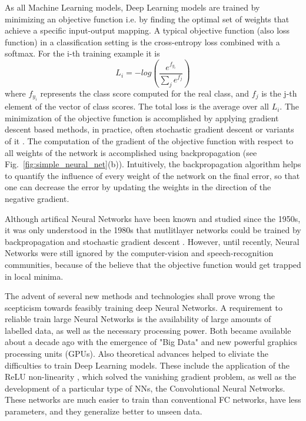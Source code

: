 As all Machine Learning models, Deep Learning models are trained by minimizing an objective function i.e. by finding the optimal set of weights that achieve a specific input-output mapping. A typical objective function (also loss function) in a classification setting is the cross-entropy loss combined with a softmax. For the i-th training example it is
$$
L_i = -log\left(\frac{e^{f_{y_i}}}{\sum_j e^{f_j}}\right)
$$
where $f_{y_i}$ represents the class score computed for the real class, and $f_j$ is the j-th element of the vector of class scores. The total loss is the average over all $L_i$. The minimization of the objective function is accomplished by applying gradient descent based methods, in practice, often  stochastic gradient descent \parencite{bottou2008} or variants of it \parencite{ruder2016}. The computation of the gradient of the objective function with respect to all weights of the network is accomplished using backpropagation \parencite{rumelhart1986} (see Fig.~\ref{fig:simple_neural_net}(b)).
Intuitively, the backpropagation algorithm helps to quantify the influence of every weight of the network on the final error, so that one can decrease the error by updating the weights in the direction of the negative gradient.

Although artifical Neural Networks have been known and studied since the 1950s, it was only understood in the 1980s that mutlitlayer networks could be trained by backpropagation and stochastic gradient descent \parencite{lecun1989}. However, until recently, Neural Networks were still ignored by the computer-vision and speech-recognition communities, because of the believe that the objective function would get trapped in local minima. 

The advent of several new methods and technologies shall prove wrong the scepticism towards feasibly training deep Neural Networks. A requirement to reliable train large Neural Networks is the availability of large amounts of labelled data, as well as the necessary processing power. Both became available  about a decade ago with the emergence of "Big Data" and new powerful graphics processing units (GPUs).
Also theoretical advances helped to eliviate the difficulties to train Deep Learning models. These include the application of the ReLU non-linearity \parencite{glorot2011}, which solved the vanishing gradient problem, as well as the development of a particular type of NNs, the Convolutional Neural Networks. These networks are much easier to train than conventional FC networks, have less parameters, and they generalize better to unseen data. 


